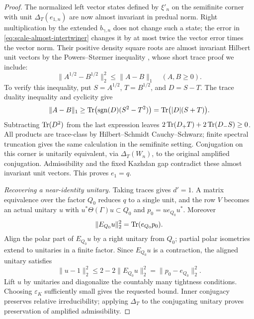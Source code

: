 \begin{proof}
The normalized left vector states defined by \(\xi'_n\)
on the semifinite corner with unit \(\Delta_T(e_{1,n})\)
are now almost invariant in predual norm.  Right
multiplication by the extended \(b_{\gamma,n}\) does not
change such a state; the error in
\eqref{eq:scale-almost-intertwiner} changes it by at most
twice the vector error times the vector norm.
Their positive density square roots are almost invariant
Hilbert unit vectors by the Powers--St\o rmer inequality
\cite{PowersStormer1970}, whose short trace proof we include:
\begin{equation}
 \|A^{1/2}-B^{1/2}\|_2^2\le\|A-B\|_1
 \quad(A,B\ge0).
 \label{eq:scale-square-root}
\end{equation}
To verify this inequality, put \(S=A^{1/2}\), \(T=B^{1/2}\),
and \(D=S-T\).  The trace duality inequality and cyclicity give
\[
 \|A-B\|_1\ge
 \operatorname{Tr}\bigl(\operatorname{sgn}(D)(S^2-T^2)\bigr)
 =\operatorname{Tr}\bigl(|D|(S+T)\bigr).
\]
Subtracting \(\operatorname{Tr}(D^2)\) from the last expression leaves
\(2\operatorname{Tr}(D_+T)+2\operatorname{Tr}(D_-S)\ge0\).
All products are trace-class by Hilbert--Schmidt
Cauchy--Schwarz; finite spectral truncation gives the same
calculation in the semifinite setting.
Conjugation on this corner is unitarily equivalent, via
\(\Delta_T(W_n)\), to the original amplified conjugation.
Admissibility and the fixed Kazhdan gap contradict these
almost invariant unit vectors.  This proves \(e_1=q\).

\emph{Recovering a near-identity unitary.}
Taking traces gives \(d'=1\). A matrix equivalence over
the factor \(Q_0\) reduces \(q\) to a single unit, and the
row \(V\) becomes an actual unitary \(u\) with
\(u^*\Theta(\Gamma)u\subset Q_0\) and
\(p_0=ue_{Q_0}u^*\).
Moreover
\begin{equation}
 \|E_{Q_0}u\|_2^2=\operatorname{Tr}(e_{Q_0}p_0).
 \label{eq:scale-jones-pairing}
\end{equation}
Align the polar part of \(E_{Q_0}u\) by a right unitary
from \(Q_0\); partial polar isometries extend to unitaries
in a finite factor.  Since \(E_{Q_0}u\) is a contraction,
the aligned unitary satisfies
\begin{equation}
 \|u-1\|_2^2
 \le2-2\|E_{Q_0}u\|_2^2
 =\|p_0-e_{Q_0}\|_2^2.
 \label{eq:scale-close-unitary}
\end{equation}
Lift \(u\) by unitaries and diagonalize the countably many
tightness conditions.  Choosing \(\varepsilon_K\) sufficiently
small gives the requested bound.  Inner conjugacy preserves
relative irreducibility; applying \(\Delta_T\) to the
conjugating unitary proves preservation of amplified
admissibility.
\end{proof}

